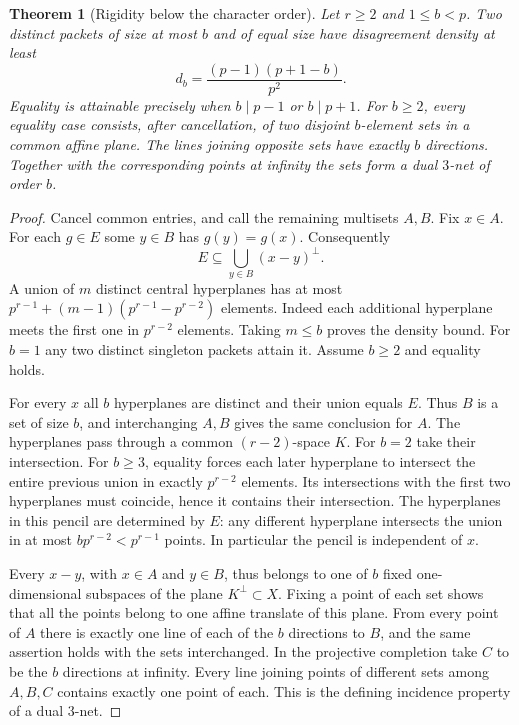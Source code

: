 \documentclass[11pt,letterpaper]{article}
\newtheorem{theorem}{Theorem}[section]
\theoremstyle{remark}
\begin{document}
\begin{theorem}[Rigidity below the character order]\label{base:rigid}
Let $r\ge 2$ and $1\le b<p$.  Two distinct packets of size at most
$b$ and of equal size have disagreement density at least
\[
 d_b=\frac{(p-1)(p+1-b)}{p^2}.
\]
Equality is attainable precisely when $b\mid p-1$ or $b\mid p+1$.
For $b\ge2$, every equality case consists, after cancellation, of two
disjoint $b$-element sets in a common affine plane.  The lines joining
opposite sets have exactly $b$ directions. Together with the corresponding
points at infinity the sets form a dual $3$-net of order $b$.
\end{theorem}

\begin{proof}
Cancel common entries, and call the remaining multisets $A,B$. Fix
$x\in A$.  For each $g\in E$ some $y\in B$ has $g(y)=g(x)$.  Consequently
\[
 E\subseteq\bigcup_{y\in B}(x-y)^\perp.
\]
A union of $m$ distinct central hyperplanes has at most
$p^{r-1}+(m-1)(p^{r-1}-p^{r-2})$ elements. Indeed each additional
hyperplane meets the first one in $p^{r-2}$ elements.  Taking $m\le b$
proves the density bound.  For $b=1$ any two distinct singleton packets
attain it.  Assume $b\ge2$ and equality holds.

For every $x$ all $b$ hyperplanes are distinct and their union equals $E$.
Thus $B$ is a set of size $b$, and interchanging $A,B$ gives the same
conclusion for $A$.  The hyperplanes pass through a common
$(r-2)$-space $K$.  For $b=2$ take their intersection.  For $b\ge3$,
equality forces each later hyperplane to intersect the entire previous
union in exactly $p^{r-2}$ elements. Its intersections with the first
two hyperplanes must coincide, hence it contains their intersection.
The hyperplanes in this pencil are determined by $E$: any different
hyperplane intersects the union in at most $bp^{r-2}<p^{r-1}$ points.
In particular the pencil is independent of $x$.

Every $x-y$, with $x\in A$ and $y\in B$, thus belongs to one of $b$ fixed
one-dimensional subspaces of the plane $K^\perp\subset X$.  Fixing a
point of each set shows that all the points belong to one affine translate
of this plane.  From every point of $A$ there is exactly one line of
each of the $b$ directions to $B$, and the same assertion holds with the
sets interchanged.  In the projective completion take $C$ to be the $b$
directions at infinity. Every line joining points of different sets
among $A,B,C$ contains exactly one point of each. This is the defining
incidence property of a dual $3$-net.


\end{proof}
\end{document}
